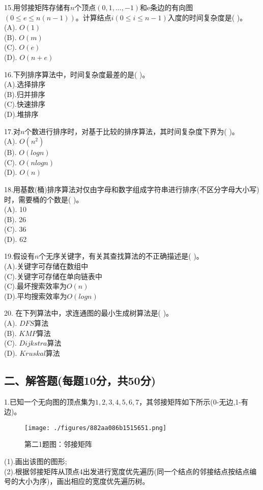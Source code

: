 15.用邻接矩阵存储有$n$个顶点$(0,1,...,-1)$和e条边的有向图$(0\leqslant e\leqslant n(n-1))$。计算结点$i(0\leqslant i\leqslant n-1)$入度的时间复杂度是( )。 \\
(A). $O(1)$ \\
(B). $O(m)$ \\
(C). $O(e)$ \\
(D). $O(n+e)$

16.下列排序算法中，时间复杂度最差的是( )。 \\
(A).选择排序 \\
(B).归并排序 \\
(C).快速排序 \\
(D).堆排序

17.对$n$个数进行排序时，对基于比较的排序算法，其时间复杂度下界为( )。 \\
(A). $O(n^2)$ \\
(B). $O(logn)$ \\
(C). $O(nlogn)$ \\
(D). $O(n)$

18.用基数(桶)排序算法对仅由字母和数字组成字符串进行排序(不区分字母大小写)时，需要桶的个数是( )。 \\
(A). 10 \\
(B). 26 \\
(C). 36 \\
(D). 62

19.假设有$n$个无序关键字，有关其查找算法的不正确描述是( )。 \\
(A).关键字可存储在数组中 \\
(C).关键字可存储在单向链表中 \\
(C).最坏搜索效率为$O(n)$ \\
(D).平均搜索效率为$O(logn)$

20. 在下列算法中，求连通图的最小生成树算法是( )。 \\
(A). $DFS$算法 \\
(B). $KMP$算法 \\
(C). $Dijkstra$算法 \\
(D). $Kruskal$算法

\subsection{二、解答题(每题10分，共50分)}
1.已知一个无向图的顶点集为${1,2,3,4,5,6,7}$，其邻接矩阵如下所示(0-无边,1-有边)。
\begin{figure}[ht]
\centering
\texttt{[image: ./figures/882aa086b1515651.png]}
\caption{第二1题图：邻接矩阵} \label{fig_SYDS14_1}
\end{figure}
(1).画出该图的图形; \\
(2).根据邻接矩阵从顶点4出发进行宽度优先遍历(同一个结点的邻接结点按结点编号的大小为序)，画出相应的宽度优先遍历树。

